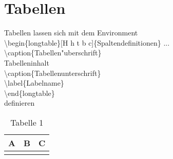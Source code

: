 \section{Tabellen}
Tabellen lassen sich mit dem Environment\\
\textbackslash begin\{longtable\}[H h t b c]\{Spaltendefinitionen\} ...\\
\textbackslash caption\{Tabellen"uberschrift\}\\
Tabelleninhalt\\
\textbackslash caption\{Tabellenunterschrift\}\\
\textbackslash label\{Labelname\}\\
\textbackslash end\{longtable\}\\
 definieren
 
\begin{longtable}[H]{|p{}|p{}|p{}|}
\hline
A&B&C\\
\hline
\caption{Tabelle 1}
\label{tab:tab1}
\end{longtable}

